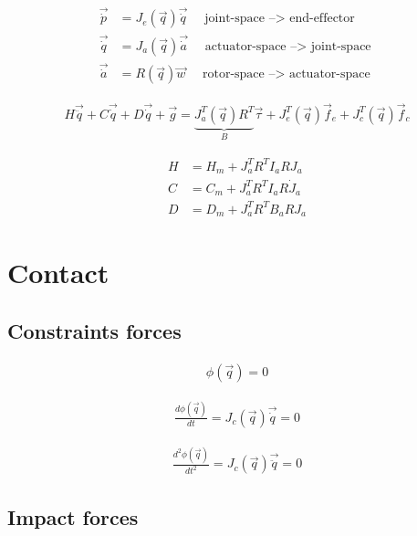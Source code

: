 \begin{align}
\vec{\dot{p}}   &= J_e( \vec{q} ) \vec{\dot{q} }  \quad \text{ joint-space    --> end-effector   } \\
\vec{\dot{q}}   &= J_a( \vec{q} ) \vec{\dot{a} }  \quad \text{ actuator-space --> joint-space    } \\
\vec{\dot{a} }  &= R( \vec{q} )   \vec{ w      }  \quad \text{ rotor-space    --> actuator-space } 
\label{eq:coord_transform}
\end{align}


\begin{align}
H \vec{\ddot{q}} + C \vec{\dot{q}} + D \vec{\dot{q}} + \vec{g} =  \underbrace{ J_a^T(\vec{q}) R^T }_B  \vec{\tau} + J_e^T(\vec{q}) \vec{f}_e + J_c^T(\vec{q}) \vec{f}_c
\label{eq:manipulator}
\end{align}

\begin{align}
H   &= H_m + J_a^T R^T I_a R J_a        \\
C   &= C_m + J_a^T R^T I_a R \dot{J}_a  \\
D   &= D_m + J_a^T R^T B_a R J_a 
\label{eq:coord_transform}
\end{align}


\section{Contact}
\label{sec:contact}

\subsection{Constraints forces}
\label{sec:constraints}

\begin{align}
\phi( \vec{ q } ) = 0
\label{eq:constraint}
\end{align}

\begin{align}
\frac{d \phi( \vec{ q } ) }{dt} = J_c( \vec{ q } ) \vec{\dot{q}}  = 0
\label{eq:constraint_diff}
\end{align}

\begin{align}
\frac{d^2 \phi( \vec{ q } ) }{dt^2} = J_c( \vec{ q } ) \vec{\ddot{q}}  = 0
\label{eq:constraint_diff2}
\end{align}



\subsection{Impact forces}
\label{sec:impact}




